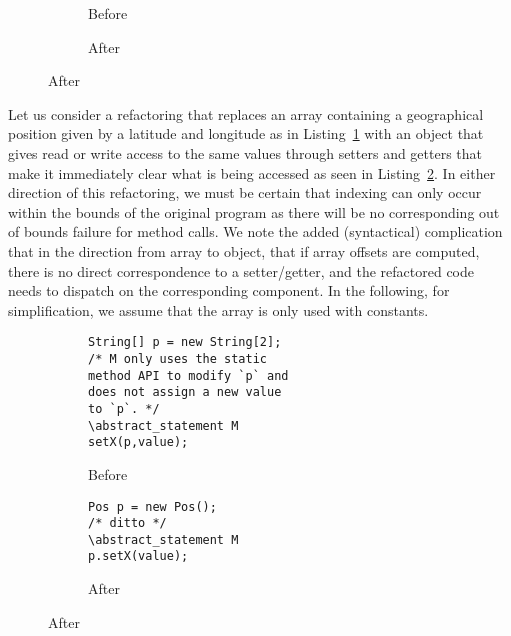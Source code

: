 \begin{figure}[tbp]
  \begin{subfigure}[h]{.45\linewidth} 
    
    \caption{Before}
    \label{lst:ReplaceArray-java-before}
  \end{subfigure}\hspace{1cm}
  \begin{subfigure}[h]{.45\linewidth}
    
    \caption{After}
    \label{lst:ReplaceArray-java-after}
  \end{subfigure}
  \label{refa:ReplaceArray-java}
\end{figure}

Let us consider a refactoring that replaces an array containing a geographical position given by a latitude and longitude as in Listing~\ref{lst:ReplaceArray-java-before} with an object that gives read or write access to the same values through setters and getters that make it immediately clear what is being accessed as seen in Listing~\ref{lst:ReplaceArray-java-after}.
In either direction of this refactoring, we must be certain that indexing can only occur within the bounds of the original program as there will be no corresponding out of bounds failure for method calls.
We note the added (syntactical) complication that in the direction from array to object, that if array offsets are computed, there is no direct correspondence to a setter/getter,
and the refactored code needs to dispatch on the corresponding component.
In the following, for simplification, we assume that the array is only used with constants.



\begin{figure}[tbp]
  \begin{subfigure}[b]{.45\linewidth} 
    \begin{lstlisting}[style=smallJava]
String[] p = new String[2];
/* M only uses the static
method API to modify `p` and
does not assign a new value
to `p`. */
\abstract_statement M
setX(p,value);
    \end{lstlisting}
    \caption{Before}
    \label{lst:ArrayBefore}
  \end{subfigure}\hspace{1cm}
  \begin{subfigure}[b]{.45\linewidth}
        \begin{lstlisting}[style=smallJava]
Pos p = new Pos();
/* ditto */
\abstract_statement M
p.setX(value);
    \end{lstlisting}
    \caption{After}
    \label{lst:ArrayAfter}
  \end{subfigure}
  \label{lst:ReplaceArray-REF}
\end{figure}

